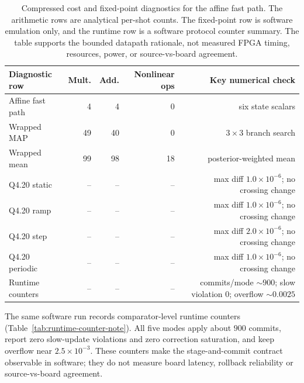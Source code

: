 \documentclass[11pt]{article}
\begin{document}
\begin{table}[ht]
\centering
\scriptsize
\begin{tabular}{lrrrr}
\toprule
Diagnostic row & Mult. & Add. & Nonlinear ops & Key numerical check \\
\midrule
Affine fast path & 4 & 4 & 0 & six state scalars \\
Wrapped MAP & 49 & 40 & 0 & \(3\times3\) branch search \\
Wrapped mean & 99 & 98 & 18 & posterior-weighted mean \\
Q4.20 static & -- & -- & -- & max diff \(1.0\times10^{-6}\); no crossing change \\
Q4.20 ramp & -- & -- & -- & max diff \(1.0\times10^{-6}\); no crossing change \\
Q4.20 step & -- & -- & -- & max diff \(2.0\times10^{-6}\); no crossing change \\
Q4.20 periodic & -- & -- & -- & max diff \(1.0\times10^{-6}\); no crossing change \\
Runtime counters & -- & -- & -- & commits/mode \(\sim900\); slow violation \(0\); overflow \(\sim0.0025\) \\
\bottomrule
\end{tabular}
\caption{Compressed cost and fixed-point diagnostics for the affine fast path.
The arithmetic rows are analytical per-shot counts.  The fixed-point row is
software emulation only, and the runtime row is a software protocol counter
summary.  The table supports the bounded datapath rationale, not measured FPGA
timing, resources, power, or source-vs-board agreement.}
\label{tab:cost-fixedpoint-note}
\end{table}

The same software run records comparator-level runtime counters
(Table~\ref{tab:runtime-counter-note}).  All five modes apply about \(900\)
commits, report zero slow-update violations and zero correction saturation,
and keep overflow near \(2.5\times10^{-3}\).  These counters make the
stage-and-commit contract observable in software; they do not measure board
latency, rollback reliability or source-vs-board agreement.
\end{document}
